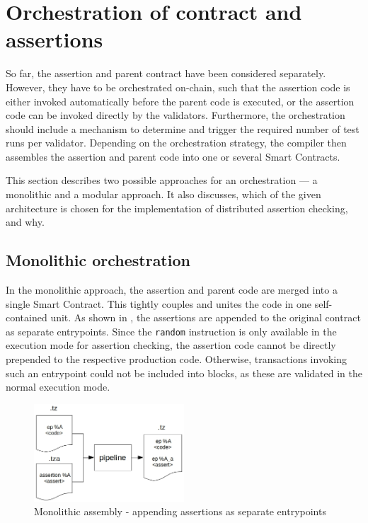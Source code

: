 \section{Orchestration of contract and assertions}\label{sec:orchestration}
So far, the assertion and parent contract have been considered separately. However, they have to be orchestrated on-chain, such that the assertion code is either invoked automatically before the parent code is executed, or the assertion code can be invoked directly by the validators. Furthermore, the orchestration should include a mechanism to determine and trigger the required number of test runs per validator. Depending on the orchestration strategy, the compiler then assembles the assertion and parent code into one or several Smart Contracts.

This section describes two possible approaches for an orchestration --- a monolithic and a modular approach. It also discusses, which of the given architecture is chosen for the implementation of distributed assertion checking, and why.

\subsection{Monolithic orchestration}
In the monolithic approach, the assertion and parent code are merged into a single Smart Contract. This tightly couples and unites the code in one self-contained unit. As shown in , the assertions are appended to the original contract as separate entrypoints. Since the \texttt{random} instruction is only available in the execution mode for assertion checking, the assertion code cannot be directly prepended to the respective production code. Otherwise, transactions invoking such an entrypoint could not be included into blocks, as these are validated in the normal execution mode.
\begin{figure}[h]
\centering
  \includegraphics[width=0.5\textwidth]{figures/5-offline_tezos/pipeline_output_mono_ep_basic.jpg}
	\caption{Monolithic assembly - appending assertions as separate entrypoints}
	\label{fig:mono_eps}
\end{figure}

